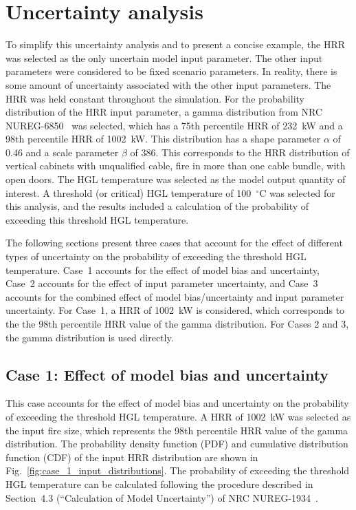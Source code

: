 \documentclass[12pt]{article}
\begin{document}
\section{Uncertainty analysis}
\label{sec:uncertainty_analysis}

 To simplify this uncertainty analysis and to present a concise example, the HRR was selected as the only uncertain model input parameter. The other input parameters were considered to be fixed scenario parameters. In reality, there is some amount of uncertainty associated with the other input parameters. The HRR was held constant throughout the simulation. For the probability distribution of the HRR input parameter, a gamma distribution from NRC NUREG-6850~\cite{NUREG_6850} was selected, which has a 75th percentile HRR of 232~kW and a 98th percentile HRR of 1002~kW. This distribution has a shape parameter $\alpha$ of 0.46 and a scale parameter $\beta$ of 386. This corresponds to the HRR distribution of vertical cabinets with unqualified cable, fire in more than one cable bundle, with open doors. The HGL temperature was selected as the model output quantity of interest. A threshold (or critical) HGL temperature of 100~$^\circ$C was selected for this analysis, and the results included a calculation of the probability of exceeding this threshold HGL temperature.

The following sections present three cases that account for the effect of different types of uncertainty on the probability of exceeding the threshold HGL temperature. Case~1 accounts for the effect of model bias and uncertainty, Case~2 accounts for the effect of input parameter uncertainty, and Case~3 accounts for the combined effect of model bias/uncertainty and input parameter uncertainty. For Case~1, a HRR of 1002~kW is considered, which corresponds to the the 98th percentile HRR value of the gamma distribution. For Cases 2 and 3, the gamma distribution is used directly.



\clearpage


\subsection{Case 1: Effect of model bias and uncertainty}

This case accounts for the effect of model bias and uncertainty on the probability of exceeding the threshold HGL temperature. A HRR of 1002~kW was selected as the input fire size, which represents the 98th percentile HRR value of the gamma distribution. The probability density function (PDF) and cumulative distribution function (CDF) of the input HRR distribution are shown in Fig.~\ref{fig:case_1_input_distributions}. The probability of exceeding the threshold HGL temperature can be calculated following the procedure described in Section~4.3 (``Calculation of Model Uncertainty'') of NRC NUREG-1934~\cite{NUREG_1934}.
\end{document}
